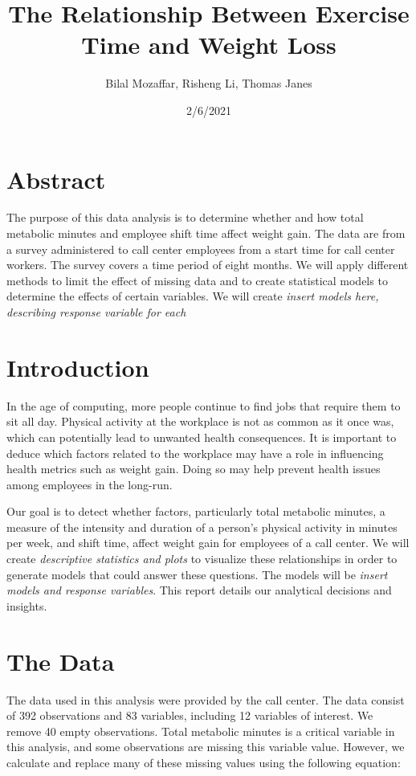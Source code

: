 \documentclass[]{article}
\title{The Relationship Between Exercise Time and Weight Loss}
\author{Bilal Mozaffar, Risheng Li, Thomas Janes}
\date{2/6/2021}
\begin{document}
\maketitle

\hypertarget{abstract}{%
\section{Abstract}\label{abstract}}

The purpose of this data analysis is to determine whether and how total
metabolic minutes and employee shift time affect weight gain. The data
are from a survey administered to call center employees from a start
time for call center workers. The survey covers a time period of eight
months. We will apply different methods to limit the effect of missing
data and to create statistical models to determine the effects of
certain variables. We will create \emph{insert models here, describing
response variable for each}

\hypertarget{introduction}{%
\section{Introduction}\label{introduction}}

In the age of computing, more people continue to find jobs that require
them to sit all day. Physical activity at the workplace is not as common
as it once was, which can potentially lead to unwanted health
consequences. It is important to deduce which factors related to the
workplace may have a role in influencing health metrics such as weight
gain. Doing so may help prevent health issues among employees in the
long-run.

Our goal is to detect whether factors, particularly total metabolic
minutes, a measure of the intensity and duration of a person's physical
activity in minutes per week, and shift time, affect weight gain for
employees of a call center. We will create \emph{descriptive statistics
and plots} to visualize these relationships in order to generate models
that could answer these questions. The models will be \emph{insert
models and response variables}. This report details our analytical
decisions and insights.

\hypertarget{the-data}{%
\section{The Data}\label{the-data}}

The data used in this analysis were provided by the call center. The
data consist of 392 observations and 83 variables, including 12
variables of interest. We remove 40 empty observations. Total metabolic
minutes is a critical variable in this analysis, and some observations
are missing this variable value. However, we calculate and replace many
of these missing values using the following equation:
\end{document}
